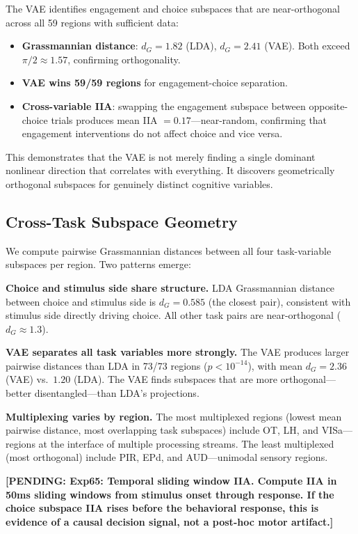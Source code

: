 \documentclass{article}
\newcommand{\pending}[1]{\textcolor{red!70!black}{\textbf{[PENDING: #1]}}}
\begin{document}
The VAE identifies engagement and choice subspaces that are near-orthogonal across all 59 regions with sufficient data:

\begin{itemize}
\item \textbf{Grassmannian distance}: $d_G = 1.82$ (LDA), $d_G = 2.41$ (VAE). Both exceed $\pi/2 \approx 1.57$, confirming orthogonality.
\item \textbf{VAE wins 59/59 regions} for engagement-choice separation.
\item \textbf{Cross-variable IIA}: swapping the engagement subspace between opposite-choice trials produces mean IIA $= 0.17$---near-random, confirming that engagement interventions do not affect choice and vice versa.
\end{itemize}

This demonstrates that the VAE is not merely finding a single dominant nonlinear direction that correlates with everything. It discovers geometrically orthogonal subspaces for genuinely distinct cognitive variables.

\subsection{Cross-Task Subspace Geometry}

We compute pairwise Grassmannian distances between all four task-variable subspaces per region. Two patterns emerge:

\textbf{Choice and stimulus side share structure.} LDA Grassmannian distance between choice and stimulus side is $d_G = 0.585$ (the closest pair), consistent with stimulus side directly driving choice. All other task pairs are near-orthogonal ($d_G \approx 1.3$).

\textbf{VAE separates all task variables more strongly.} The VAE produces larger pairwise distances than LDA in 73/73 regions ($p < 10^{-14}$), with mean $d_G = 2.36$ (VAE) vs.\ $1.20$ (LDA). The VAE finds subspaces that are more orthogonal---better disentangled---than LDA's projections.

\textbf{Multiplexing varies by region.} The most multiplexed regions (lowest mean pairwise distance, most overlapping task subspaces) include OT, LH, and VISa---regions at the interface of multiple processing streams. The least multiplexed (most orthogonal) include PIR, EPd, and AUD---unimodal sensory regions.

\pending{Exp65: Temporal sliding window IIA. Compute IIA in 50ms sliding windows from stimulus onset through response. If the choice subspace IIA rises before the behavioral response, this is evidence of a causal decision signal, not a post-hoc motor artifact.}
\end{document}
